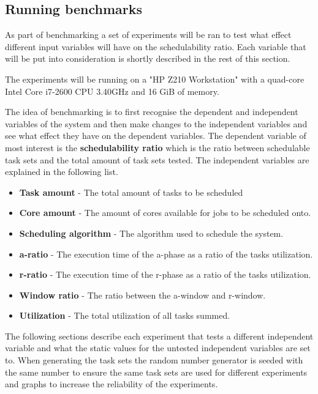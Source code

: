 \documentclass{kththesis}
\begin{document}
\subsection{Running benchmarks}\label{subsec:running_benchmarks}

As part of benchmarking a set of experiments will be ran to test what effect different input
variables will have on the schedulability ratio. Each variable that will be put into consideration
is shortly described in the rest of this section.

The experiments will be running on a "HP Z210 Workstation" with a quad-core Intel Core i7-2600 CPU
\@3.40GHz and 16 GiB of memory.

The idea of benchmarking is to first recognise the dependent and independent variables of the system
and then make changes to the independent variables and see what effect they have on the dependent
variables. The dependent variable of most interest is the \textbf{schedulability ratio} which is the
ratio between schedulable task sets and the total amount of task sets tested. The independent
variables are explained in the following list.

\begin{itemize}

    \item \textbf{Task amount} - The total amount of tasks to be scheduled
    \item \textbf{Core amount} - The amount of cores available for jobs to be scheduled onto.
    \item \textbf{Scheduling algorithm} - The algorithm used to schedule the system. 
    \item \textbf{\acrshort{a}-ratio} - The execution time of the \acrshort{a}-phase as a ratio of
        the tasks utilization.
    \item \textbf{\acrshort{r}-ratio} - The execution time of the \acrshort{r}-phase as a ratio of
        the tasks utilization.
    \item \textbf{Window ratio} - The ratio between the \acrshort{a}-window and \acrshort{r}-window.
    \item \textbf{Utilization} - The total utilization of all tasks summed.

\end{itemize}


The following sections describe each experiment that tests a different independent variable and
what the static values for the untested independent variables are set to. When generating the task
sets the random number generator is seeded with the same number to ensure the same task sets are
used for different experiments and graphs to increase the reliability of the experiments. 
\end{document}
